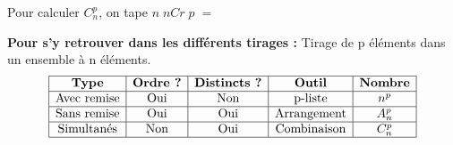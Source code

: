  Pour calculer $C_{n}^{p} $, on tape  $ n\; n Cr\; p\; =$
 
 
 \textbf{Pour s'y retrouver dans les différents tirages :}
 Tirage de p éléments dans un ensemble à n éléments.
 \[
\begin{array}{|c|c|c|c|c|}
\hline
\textbf{Type} & \textbf{Ordre ?} & \textbf{Distincts ?} & \textbf{Outil} & \textbf{Nombre} \\
\hline
\text{Avec remise} & \text{Oui} & \text{Non} & \text{p-liste} & n^{p} \\
\hline
\text{Sans remise} & \text{Oui} & \text{Oui} & \text{Arrangement} & A_{n}^{p} \\
\hline
\text{Simultanés} & \text{Non} & \text{Oui} & \text{Combinaison} & C_{n}^{p} \\
\hline
\end{array}
\]


